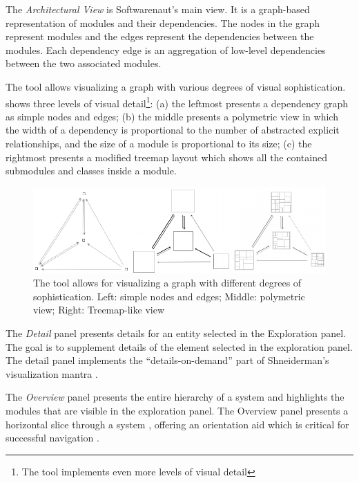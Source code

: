 \documentclass[preprint,12pt]{elsarticle}
\begin{document}
\begin{description}

\item The {\em Architectural View} is Softwarenaut's main view. It is a graph-based representation of modules and their dependencies. The nodes in the graph represent modules and the edges represent the dependencies between the modules. Each dependency edge is an aggregation of low-level dependencies between the two associated modules. 

The tool allows visualizing a graph with various degrees of visual sophistication.  shows three levels of visual detail\footnote{The tool implements even more levels of visual detail}: (a) the leftmost presents a dependency graph as simple nodes and edges; (b) the middle presents a polymetric view \cite{lanza-pv} in which the width of a dependency is proportional to the number of abstracted explicit relationships, and the size of a module is proportional to its size; (c) the rightmost presents a modified treemap layout which shows all the contained submodules and classes inside a module. 

\begin{figure}[h]
\begin{center}
\includegraphics[width=1.04\linewidth]{images/sofistication}
\caption{The tool allows for visualizing a graph with different degrees of sophistication. Left: simple nodes and edges; Middle: polymetric view; Right: Treemap-like view}

\end{center}
\end{figure}

\item The {\em Detail} panel presents details for an entity selected in the Exploration panel. The goal is to supplement details of the element selected in the exploration panel. The detail panel implements the ``details-on-demand'' part of Shneiderman's visualization mantra \cite{shneid-eyes}.

\item The {\em Overview} panel presents the entire hierarchy of a system and highlights the modules that are visible in the exploration panel. The Overview panel presents a horizontal slice through a system \cite{wong-thesis}, offering an orientation aid which is critical for successful navigation \cite{storey-awareness}.

\end{description}
\end{document}
